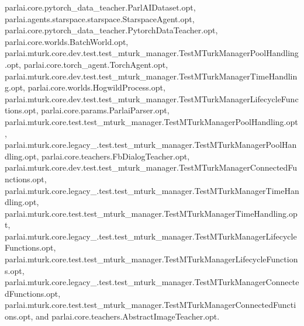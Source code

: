 parlai.\+core.\+pytorch\+\_\+data\+\_\+teacher.\+Parl\+A\+I\+Dataset.\+opt, parlai.\+agents.\+starspace.\+starspace.\+Starspace\+Agent.\+opt, parlai.\+core.\+pytorch\+\_\+data\+\_\+teacher.\+Pytorch\+Data\+Teacher.\+opt, parlai.\+core.\+worlds.\+Batch\+World.\+opt, parlai.\+mturk.\+core.\+dev.\+test.\+test\+\_\+mturk\+\_\+manager.\+Test\+M\+Turk\+Manager\+Pool\+Handling.\+opt, parlai.\+core.\+torch\+\_\+agent.\+Torch\+Agent.\+opt, parlai.\+mturk.\+core.\+dev.\+test.\+test\+\_\+mturk\+\_\+manager.\+Test\+M\+Turk\+Manager\+Time\+Handling.\+opt, parlai.\+core.\+worlds.\+Hogwild\+Process.\+opt, parlai.\+mturk.\+core.\+dev.\+test.\+test\+\_\+mturk\+\_\+manager.\+Test\+M\+Turk\+Manager\+Lifecycle\+Functions.\+opt, parlai.\+core.\+params.\+Parlai\+Parser.\+opt, parlai.\+mturk.\+core.\+test.\+test\+\_\+mturk\+\_\+manager.\+Test\+M\+Turk\+Manager\+Pool\+Handling.\+opt, parlai.\+mturk.\+core.\+legacy\+\_.\+test.\+test\+\_\+mturk\+\_\+manager.\+Test\+M\+Turk\+Manager\+Pool\+Handling.\+opt, parlai.\+core.\+teachers.\+Fb\+Dialog\+Teacher.\+opt, parlai.\+mturk.\+core.\+dev.\+test.\+test\+\_\+mturk\+\_\+manager.\+Test\+M\+Turk\+Manager\+Connected\+Functions.\+opt, parlai.\+mturk.\+core.\+legacy\+\_.\+test.\+test\+\_\+mturk\+\_\+manager.\+Test\+M\+Turk\+Manager\+Time\+Handling.\+opt, parlai.\+mturk.\+core.\+test.\+test\+\_\+mturk\+\_\+manager.\+Test\+M\+Turk\+Manager\+Time\+Handling.\+opt, parlai.\+mturk.\+core.\+legacy\+\_.\+test.\+test\+\_\+mturk\+\_\+manager.\+Test\+M\+Turk\+Manager\+Lifecycle\+Functions.\+opt, parlai.\+mturk.\+core.\+test.\+test\+\_\+mturk\+\_\+manager.\+Test\+M\+Turk\+Manager\+Lifecycle\+Functions.\+opt, parlai.\+mturk.\+core.\+legacy\+\_.\+test.\+test\+\_\+mturk\+\_\+manager.\+Test\+M\+Turk\+Manager\+Connected\+Functions.\+opt, parlai.\+mturk.\+core.\+test.\+test\+\_\+mturk\+\_\+manager.\+Test\+M\+Turk\+Manager\+Connected\+Functions.\+opt, and parlai.\+core.\+teachers.\+Abstract\+Image\+Teacher.\+opt.

